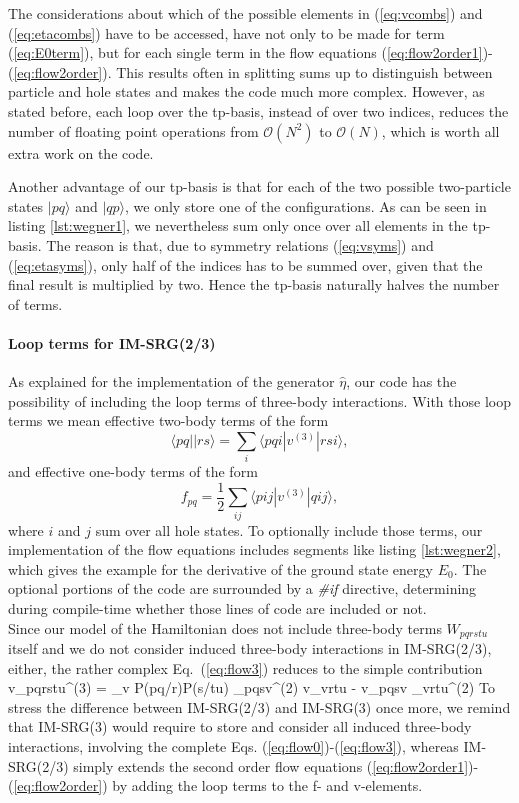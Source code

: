 The considerations about which of the possible elements in (\ref{eq:vcombs}) and (\ref{eq:etacombs}) have to be accessed, have not only to be made for term (\ref{eq:E0term}), but for each single term in the flow equations (\ref{eq:flow2order1})-(\ref{eq:flow2order}). This results often in splitting sums up to distinguish between particle and hole states and makes the code much more complex. However, as stated before, each loop over the tp-basis, instead of over two indices, reduces the number of floating point operations from $\mathcal{O}(N^2)$ to $\mathcal{O}(N)$, which is worth all extra work on the code.

Another advantage of our tp-basis is that for each of the two possible two-particle states $|pq\rangle$ and $|qp\rangle$, we only store one of the configurations. As can be seen in listing \ref{lst:wegner1}, we nevertheless sum only once over all elements in the tp-basis. The reason is that, due to symmetry relations (\ref{eq:vsyms}) and (\ref{eq:etasyms}), only  half of the indices has to be summed over, given that the final result is multiplied by two. Hence the tp-basis naturally halves the number of terms.

\paragraph*{Loop terms for IM-SRG(2/3)}
As explained for the implementation of the generator $\hat{\eta}$, our code has the possibility of including the loop terms of three-body interactions. With those loop terms we mean effective two-body terms of the form
\[
\langle p q || r s \rangle = \sum_i \langle p q i | v^{(3)} | r s i \rangle,
\]
and effective one-body terms of the form
\[
f_{pq} = \frac{1}{2}\sum_{ij} \langle p i j | v^{(3)} | q i j \rangle, 
\] 
where $i$ and $j$ sum over all hole states. To optionally include those terms, our implementation of the flow equations includes segments like listing \ref{lst:wegner2}, which gives the example for the derivative of the ground state energy $E_0$. The optional portions of the code are surrounded by a \textit{\#if} directive, determining during compile-time whether those lines of code are included or not.\\
Since our model of the Hamiltonian does not include three-body terms $W_{pqrstu}$ itself and we do not consider induced three-body interactions in IM-SRG(2/3), either, the rather complex Eq.~(\ref{eq:flow3}) reduces to the simple contribution
\be
{}v_{pqrstu}^{(3)} = \sum_v P(pq/r)P(s/tu) \lb \eta_{pqsv}^{(2)} v_{vrtu} - v_{pqsv} \eta_{vrtu}^{(2)}\rb
\label{eq:loopterms}
\ee
To stress the difference between IM-SRG(2/3) and IM-SRG(3) once more, we remind that \mbox{IM-SRG(3)} would require to store and consider all induced three-body interactions, involving the complete Eqs. (\ref{eq:flow0})-(\ref{eq:flow3}), whereas IM-SRG(2/3) simply extends the second order flow equations (\ref{eq:flow2order1})-(\ref{eq:flow2order}) by adding the loop terms to the f- and v-elements.

